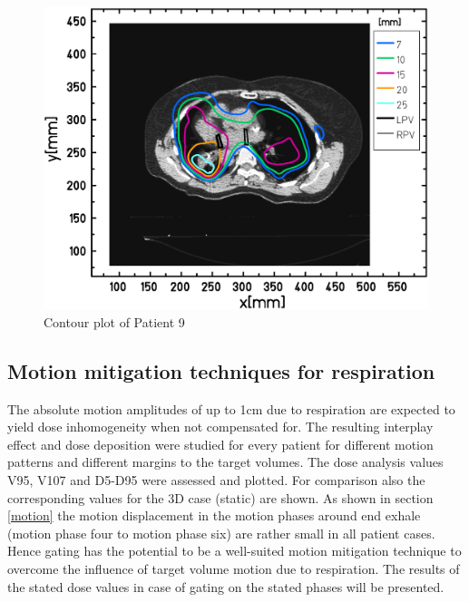 \vspace*{-0.3cm}

\begin{figure}[H]
\begin{center}
 \includegraphics[scale=0.22]{./teile/results_mdacc/Contour_z_abs_RESP_Pat122_HUSkala_gedreht_2.png}
\caption{Contour plot of Patient 9 }
\label{contour_pat122}
\end{center}
\end{figure}

\newpage


\subsection{Motion mitigation techniques for respiration}
\label{mmt}
The absolute motion amplitudes of up to 1cm due to respiration are expected to yield dose inhomogeneity when not compensated for. The 
resulting interplay effect and dose deposition were studied for every patient for different motion patterns and different margins to the target 
volumes. The dose analysis values V95, V107 and D5-D95 were assessed and plotted. For comparison also the corresponding 
values for the 3D case (static) are shown. As shown in section \ref{motion} the motion displacement in the motion phases around 
end exhale (motion phase four to motion phase six) are rather small in all patient cases. Hence gating has the potential to be a 
well-suited motion mitigation technique to overcome the influence of target volume motion due to respiration. The results of the stated dose 
values in case of gating on the stated phases will be presented. 


